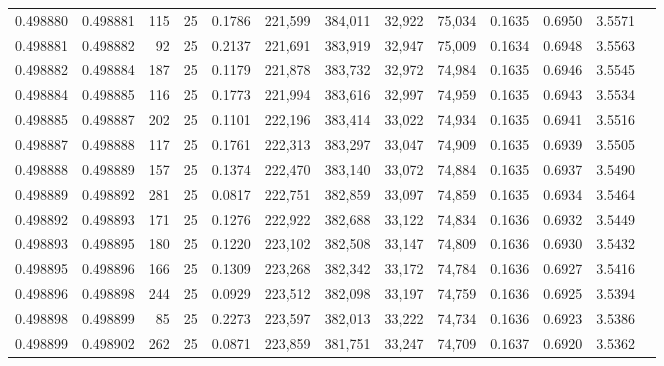 \begin{tabular}{rrrrrrrrrrrrr}
0.498880 & 0.498881 & 115 &  25 &                                     0.1786 & 221,599 & 384,011 &  32,922 &  75,034 & 0.1635 & 0.6950 & 3.5571 \\
0.498881 & 0.498882 &  92 &  25 &                                     0.2137 & 221,691 & 383,919 &  32,947 &  75,009 & 0.1634 & 0.6948 & 3.5563 \\
0.498882 & 0.498884 & 187 &  25 &                                     0.1179 & 221,878 & 383,732 &  32,972 &  74,984 & 0.1635 & 0.6946 & 3.5545 \\
0.498884 & 0.498885 & 116 &  25 &                                     0.1773 & 221,994 & 383,616 &  32,997 &  74,959 & 0.1635 & 0.6943 & 3.5534 \\
0.498885 & 0.498887 & 202 &  25 &                                     0.1101 & 222,196 & 383,414 &  33,022 &  74,934 & 0.1635 & 0.6941 & 3.5516 \\
0.498887 & 0.498888 & 117 &  25 &                                     0.1761 & 222,313 & 383,297 &  33,047 &  74,909 & 0.1635 & 0.6939 & 3.5505 \\
0.498888 & 0.498889 & 157 &  25 &                                     0.1374 & 222,470 & 383,140 &  33,072 &  74,884 & 0.1635 & 0.6937 & 3.5490 \\
0.498889 & 0.498892 & 281 &  25 &                                     0.0817 & 222,751 & 382,859 &  33,097 &  74,859 & 0.1635 & 0.6934 & 3.5464 \\
0.498892 & 0.498893 & 171 &  25 &                                     0.1276 & 222,922 & 382,688 &  33,122 &  74,834 & 0.1636 & 0.6932 & 3.5449 \\
0.498893 & 0.498895 & 180 &  25 &                                     0.1220 & 223,102 & 382,508 &  33,147 &  74,809 & 0.1636 & 0.6930 & 3.5432 \\
0.498895 & 0.498896 & 166 &  25 &                                     0.1309 & 223,268 & 382,342 &  33,172 &  74,784 & 0.1636 & 0.6927 & 3.5416 \\
0.498896 & 0.498898 & 244 &  25 &                                     0.0929 & 223,512 & 382,098 &  33,197 &  74,759 & 0.1636 & 0.6925 & 3.5394 \\
0.498898 & 0.498899 &  85 &  25 &                                     0.2273 & 223,597 & 382,013 &  33,222 &  74,734 & 0.1636 & 0.6923 & 3.5386 \\
0.498899 & 0.498902 & 262 &  25 &                                     0.0871 & 223,859 & 381,751 &  33,247 &  74,709 & 0.1637 & 0.6920 & 3.5362 \\

\end{tabular}
